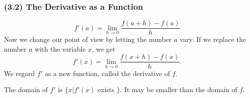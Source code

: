 \begin{frame}
\frametitle{(3.2) The Derivative as a Function}
\[
f'(a) = \lim_{h\rightarrow 0}\frac{f(a+h)-f(a)}{h}
\]
Now we change our point of view by letting the number $a$ vary.  If we replace the number $a$ with the variable $x$, we get
\[
f'(x) = \lim_{h\rightarrow 0}\frac{f(x+h)-f(x)}{h}.
\]
We regard $f'$ as a new function, called the derivative of $f$.

The domain of $f'$ is $\{ x | f'(x)$ exists $\}$.  It may be smaller than the domain of $f$.
\end{frame}
